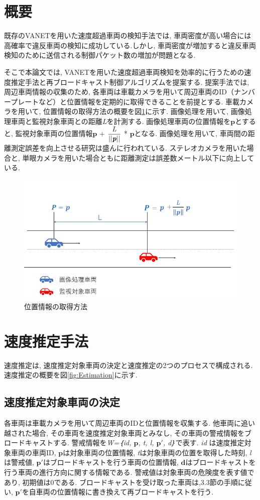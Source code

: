 \documentclass[10pt]{jreport}
\begin{document}
\section{概要}
既存のVANETを用いた速度超過車両の検知手法\cite{sample10}では, 車両密度が高い場合には高確率で違反車両の検知に成功している.しかし, 車両密度が増加すると違反車両検知のために送信される制御パケット数の増加が問題となる.

そこで本論文では, VANETを用いた速度超過車両検知を効率的に行うための速度推定手法と再ブロードキャスト制御アルゴリズムを提案する. 提案手法では, 周辺車両情報の収集のため, 各車両は車載カメラを用いて周辺車両のID（ナンバープレートなど）と位置情報を定期的に取得できることを前提とする. 車載カメラを用いて, 位置情報の取得方法の概要を図\ref{fig:image}に示す. 画像処理を用いて, 画像処理車両と監視対象車両との距離{\it L}を計測する. 画像処理車両の位置情報を$\bm{p}$とすると, 監視対象車両の位置情報$\bm{p}$ + $\dfrac{{\it L}}{||\textit{\textbf{p}}||}$ * $\bm{p}$となる. 画像処理を用いて, 車両間の距離測定誤差を向上させる研究は盛んに行われている\cite{sample15}\cite{sample16}. ステレオカメラを用いた場合と, 単眼カメラを用いた場合ともに距離測定は誤差数メートル以下に向上している.


\begin{figure}[H]
\centering
\includegraphics[width=12cm]{figures/3_1image.png}
\caption{位置情報の取得方法}
\label{fig:image}
\end{figure}

\section{速度推定手法}
速度推定は, 速度推定対象車両の決定と速度推定の2つのプロセスで構成される.速度推定の概要を図\ref{fig:Estimation}に示す.

\subsection{速度推定対象車両の決定}
各車両は車載カメラを用いて周辺車両のIDと位置情報を収集する. 他車両に追い越された場合, その車両を速度推定対象車両とみなし, その車両の警戒情報をブロードキャストする. 警戒情報を{\it W=｛id, $\bm{p}$, t, l, $\bm{p'}$, d｝}で表す. {\it id} は速度推定対象車両の車両ID, $\bm{p}$は対象車両の位置情報, {\it t}は対象車両の位置を取得した時刻, {\it l}は警戒値, $\bm{p'}$はブロードキャストを行う車両の位置情報, $\bm{d}$はブロードキャストを行う車両の進行方向に関する情報である. 警戒値は対象車両の危険度を表す値であり, 初期値は0である. ブロードキャストを受け取った車両は,3.3節の手順に従い, $\bm{p'}$を自車両の位置情報に書き換えて再ブロードキャストを行う.
\end{document}
